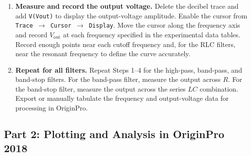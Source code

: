 \documentclass[12pt,a4paper]{article}
\begin{document}
\begin{enumerate}[leftmargin=0.8cm,label=\textbf{Step \arabic*:},itemsep=0.55em]
		\item \textbf{Measure and record the output voltage.}
		Delete the decibel trace and add \texttt{V(Vout)} to display the output-voltage amplitude. Enable the cursor from \texttt{Trace $\rightarrow$ Cursor $\rightarrow$ Display}. Move the cursor along the frequency axis and record $V_{\mathrm{out}}$ at each frequency specified in the experimental data tables. Record enough points near each cutoff frequency and, for the RLC filters, near the resonant frequency to define the curve accurately.
		
		\item \textbf{Repeat for all filters.}
		Repeat Steps 1--4 for the high-pass, band-pass, and band-stop filters. For the band-pass filter, measure the output across $R$. For the band-stop filter, measure the output across the series $LC$ combination. Export or manually tabulate the frequency and output-voltage data for processing in OriginPro.
	\end{enumerate}
	
	\subsection*{Part 2: Plotting and Analysis in OriginPro 2018}
	
\end{document}
